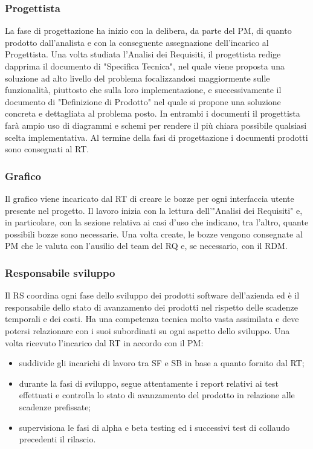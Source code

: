 \subsubsection{Progettista}
La fase di progettazione ha inizio con la delibera, da parte del PM, di quanto prodotto
dall\textquoteright{}analista e con la conseguente assegnazione dell\textquoteright{}incarico al Progettista. Una volta
studiata l\textquoteright{}Analisi dei Requisiti, il progettista redige dapprima il documento di "Specifica
Tecnica", nel quale viene proposta una soluzione ad alto livello del problema focalizzandosi
maggiormente sulle funzionalit\`{a}, piuttosto che sulla loro implementazione, e successivamente
il documento di "Definizione di Prodotto" nel quale si propone una soluzione concreta e
dettagliata al problema posto. In entrambi i documenti il progettista far\`{a} ampio uso di
diagrammi e schemi per rendere il pi\`{u} chiara possibile qualsiasi scelta implementativa.
Al termine della fasi di progettazione i documenti prodotti sono consegnati al RT.

\subsubsection{Grafico}
Il grafico viene incaricato dal RT di creare le bozze per ogni interfaccia utente presente
nel progetto. Il lavoro inizia con la lettura dell\textquoteright{}"Analisi dei Requisiti" e, in particolare,
con la sezione relativa ai casi d\textquoteright{}uso che indicano, tra l\textquoteright{}altro, quante possibili bozze sono
necessarie. Una volta create, le bozze vengono consegnate al PM che le valuta con
l\textquoteright{}ausilio del team del RQ e, se necessario, con il RDM.

\subsubsection{Responsabile sviluppo}
Il RS coordina ogni fase dello sviluppo dei prodotti software dell\textquoteright{}azienda ed \`{e} il responsabile
dello stato di avanzamento dei prodotti nel rispetto delle scadenze temporali e
dei costi. Ha una competenza tecnica molto vasta assimilata e deve potersi
relazionare con i suoi subordinati su ogni aspetto dello sviluppo. Una volta ricevuto
l\textquoteright{}incarico dal RT in accordo con il PM:
\begin{itemize}
\item suddivide gli incarichi di lavoro tra SF e SB in base a quanto fornito dal RT;
\item durante la fasi di sviluppo, segue attentamente i report relativi ai test effettuati e
controlla lo stato di avanzamento del prodotto in relazione alle scadenze prefissate;
\item supervisiona le fasi di alpha e beta testing ed i successivi test di collaudo precedenti
il rilascio.
\end{itemize}

